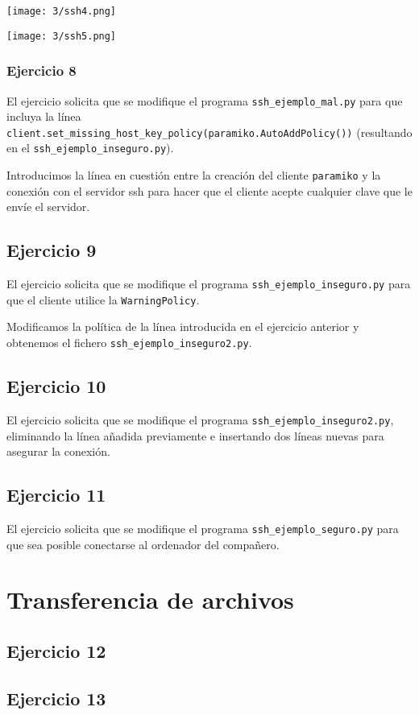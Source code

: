 \begin{minipage}{\linewidth}
    \centering
    \texttt{[image: 3/ssh4.png]}
    \label{fig:3/9}
\end{minipage}

\begin{minipage}{\linewidth}
    \centering
    \texttt{[image: 3/ssh5.png]}
    \label{fig:3/10}
\end{minipage}

\subsubsection{Ejercicio 8}
El ejercicio solicita que se modifique el programa \Verb#ssh_ejemplo_mal.py#
para que incluya la línea \Verb#client.set_missing_host_key_policy(paramiko.AutoAddPolicy())#
(resultando en el \Verb#ssh_ejemplo_inseguro.py#).

Introducimos la línea en cuestión entre la creación del cliente \Verb#paramiko#
y la conexión con el servidor ssh para hacer que el cliente acepte cualquier
clave que le envíe el servidor.

\subsection{Ejercicio 9}
El ejercicio solicita que se modifique el programa \Verb#ssh_ejemplo_inseguro.py#
para que el cliente utilice la \Verb#WarningPolicy#.

Modificamos la política de la línea introducida en el ejercicio anterior y
obtenemos el fichero \Verb#ssh_ejemplo_inseguro2.py#.

\subsection{Ejercicio 10}

El ejercicio solicita que se modifique el programa \Verb#ssh_ejemplo_inseguro2.py#,
eliminando la línea añadida previamente e insertando dos líneas nuevas para asegurar la conexión.

\subsection{Ejercicio 11}

El ejercicio solicita que se modifique el programa \Verb#ssh_ejemplo_seguro.py#
para que sea posible conectarse al ordenador del compañero.

\section{Transferencia de archivos}
\subsection{Ejercicio 12}
\subsection{Ejercicio 13}
